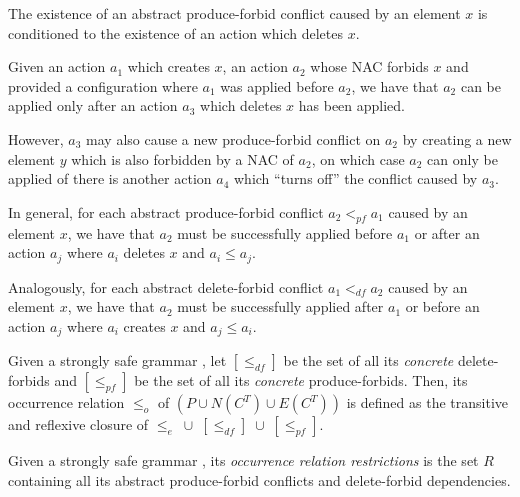 \begin{remark} The existence of an abstract produce-forbid conflict caused by an element $x$ is conditioned to the existence of an action which deletes $x$.

  Given an action $a_1$ which creates $x$, an action $a_2$ whose NAC forbids $x$ and provided a configuration where $a_1$ was applied before $a_2$, we have that $a_2$ can be applied only after an action $a_3$ which deletes $x$ has been applied.

  However, $a_3$ may also cause a new produce-forbid conflict on $a_2$ by creating a new element $y$ which is also forbidden by a NAC of $a_2$, on which case $a_2$ can only be applied of there is another action $a_4$ which ``turns off'' the conflict caused by $a_3$.

  In general, for each abstract produce-forbid conflict $a_2 <_{pf} a_1$ caused by an element $x$, we have that $a_2$ must be successfully applied before $a_1$ or after an action $a_{j}$ where $a_i$ deletes $x$ and $a_i \leq a_j$.

  Analogously, for each abstract delete-forbid conflict $a_1 <_{df} a_2$ caused by an element $x$, we have that $a_2$ must be successfully applied after $a_1$ or before an action $a_j$ where $a_i$ creates $x$ and $a_j \leq a_i$.
\end{remark}

\begin{definition} Given a strongly safe grammar \doublyTypedGraphGrammarCore{}, let $[\leq_{df}]$ be the set of all its \emph{concrete} delete-forbids and $[\leq_{pf}]$ be the set of all its \emph{concrete} produce-forbids. Then, its occurrence relation $\leq_o$ of $(P \cup N(C^T) \cup E(C^T))$ is defined as the transitive and reflexive closure of \mbox{$\leq_{e}$ $\cup$ $[\leq_{df}]$ $\cup$ $[\leq_{pf}]$}.
\end{definition}

\begin{definition} Given a strongly safe grammar \doublyTypedGraphGrammarCore{}, its \emph{occurrence relation restrictions} is the set $R$ containing all its abstract produce-forbid conflicts and delete-forbid dependencies.
\end{definition}

